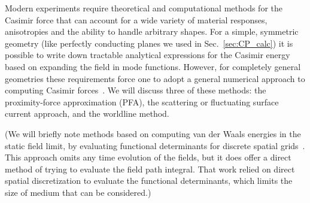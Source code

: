 Modern experiments require theoretical and computational methods
for the Casimir force that can account for a wide variety of material responses, anisotropies
and the ability to handle arbitrary shapes.  
For a simple, symmetric geometry (like perfectly conducting planes we used in Sec.~\ref{sec:CP_calc})
it is possible to write down tractable analytical expressions for
the Casimir energy based on expanding the field in mode functions.
However, for completely general geometries these requirements force one to adopt a general 
numerical approach to computing Casimir forces~\cite{Johnson2011}.
We will discuss three of these methods: the proximity-force approximation (PFA), the scattering
or fluctuating surface current approach, and the worldline method.

(We will briefly note methods based on computing van der Waals energies in the static field limit,
by evaluating functional determinants for discrete spatial grids~\cite{Maggs2006,Pasquali2008}. This approach 
omits any time evolution of the fields, but it does offer a direct method of trying to evaluate the field path integral.
That work relied on direct spatial discretization to evaluate the functional determinants, which limits
the size of medium that can be considered.)




